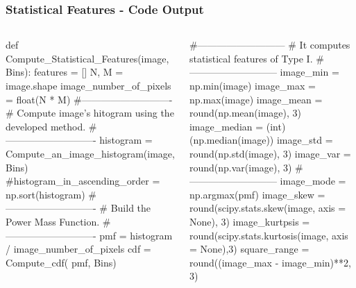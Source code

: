 \begin{frame}[fragile]
    \frametitle{Statistical Features - Code Output}
\begin{columns}
    \begin{roundedcodebox}
    \begin{python}  
    def Compute_Statistical_Features(image, Bins):        
    features = []     
    N, M = image.shape  
    image_number_of_pixels = float(N * M) 
    #----------------------------
    # Compute image's hitogram using the developed method.
    #----------------------------
    histogram = Compute_an_image_histogram(image, Bins)        
    #histogram_in_ascending_order = np.sort(histogram)               
    #----------------------------
    # Build the Power Mass Function.
    #----------------------------
    pmf = histogram / image_number_of_pixels
    cdf = Compute_cdf( pmf, Bins)        
\end{python}
\end{roundedcodebox}
    \begin{roundedcodebox}
    \begin{python}  
    #---------------------------
    # It computes statistical features of Type I.
    #---------------------------
    image_min = np.min(image) 
    image_max = np.max(image)
    image_mean = round(np.mean(image), 3) 
    image_median = (int) (np.median(image))
    image_std = round(np.std(image), 3)  
    image_var = round(np.var(image), 3) 
    #---------------------------   
    image_mode = np.argmax(pmf)
    image_skew = round(scipy.stats.skew(image, axis = None), 3)
    image_kurtpsis = round(scipy.stats.kurtosis(image, axis = None),3)
    square_range = round((image_max - image_min)**2, 3)
\end{python}
\end{roundedcodebox}
    \end{columns}
\end{frame}


